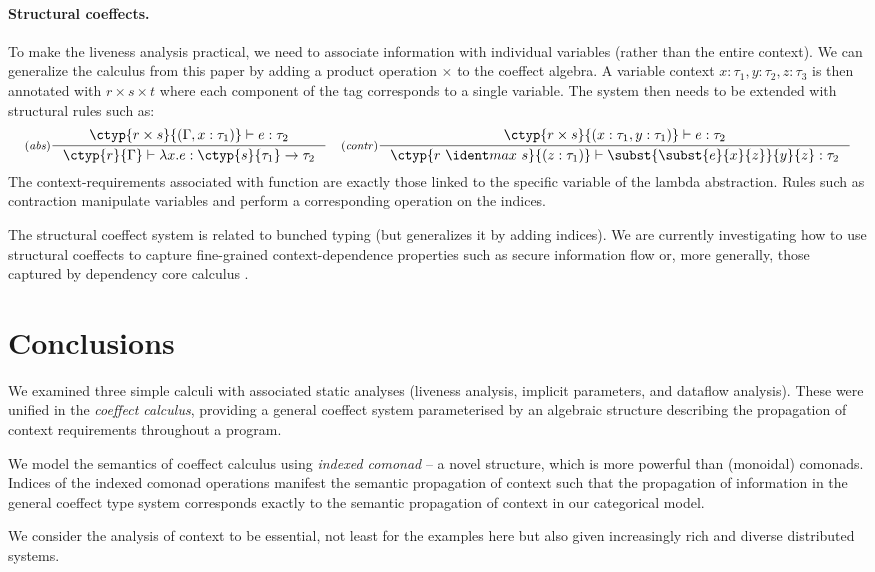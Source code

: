 \vspace{-1em}
\paragraph{Structural coeffects.} To make the liveness analysis practical, we need to associate
information with individual variables (rather than the entire context). We can generalize the 
calculus from this paper by adding a product operation $\times$ to the coeffect algebra.
A variable context $x:\tau_1, y:\tau_2, z:\tau_3$ is then annotated with
$r\times s \times t$ where each component of the tag corresponds to a single variable. The system
then needs to be extended with structural rules such as:
%
\begin{equation*}
\inference[(\emph{abs})]
  {\ctyp{r \cprd s}{(\Gamma, x:\tau_1)} \vdash e : \tau_2}
  {\ctyp{r}{\Gamma} \vdash \lambda x.e : \ctyp{s}{\tau_1} \rightarrow \tau_2 }
\quad
\inference[(\emph{contr})]
  {\ctyp{r \cprd s}{(x:\tau_1, y:\tau_1)} \vdash e : \tau_2}
  {\ctyp{r \cvop s }{(z:\tau_1)} \vdash \subst{\subst{e}{x}{z}}{y}{z} : \tau_2 }
\end{equation*}
%
The context-requirements associated with function are exactly those linked to the specific
variable of the lambda abstraction. Rules such as contraction manipulate variables and perform
a corresponding operation on the indices.

The structural coeffect system is related to bunched typing \cite{types-bunched} (but generalizes
it by adding indices). We are currently investigating how to use structural coeffects to capture 
fine-grained context-dependence properties such as secure information flow \cite{app-secure-flow}
or, more generally, those captured by dependency core calculus \cite{types-dcc}.


\section{Conclusions}

We examined three simple calculi with associated
static analyses (liveness analysis, implicit parameters, and dataflow
analysis). These were unified in the \emph{coeffect calculus},
providing a general coeffect system parameterised by an
algebraic structure describing the propagation of context
requirements throughout a program.

We model the semantics of coeffect calculus using \emph{indexed comonad} -- a novel structure, which
is more powerful than (monoidal) comonads. Indices of the indexed comonad operations manifest the 
semantic propagation of context such that the propagation of information in the general coeffect
type system corresponds exactly to the semantic propagation of context in our categorical model.

We consider the analysis of context to be essential, not least for the examples here but 
also given increasingly rich and diverse distributed systems.
